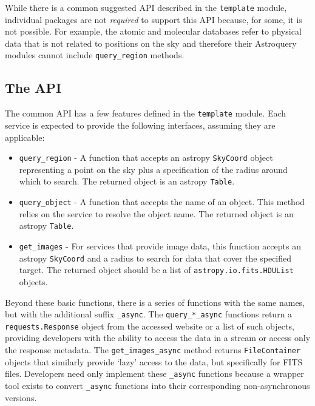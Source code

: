\documentclass[twocolumn]{aastex61}
\begin{document}
While there is a common suggested API described in the \texttt{template} module,
individual packages are not \emph{required} to support this API because, for
some, it is not possible.  For example, the atomic and molecular databases refer
to physical data that is not related to positions on the sky and therefore
their Astroquery modules cannot include \texttt{query\_region} methods.

\subsection{The API}
The common API has a few features defined in the \texttt{template} module.
Each service is expected to provide the following interfaces, assuming they are
applicable:

\begin{itemize}
    \item \texttt{query\_region} - A function that accepts an astropy
        \texttt{SkyCoord} object representing a point on the sky plus a
        specification of the radius around which to search.
        The returned object is an astropy \texttt{Table}.
    \item \texttt{query\_object} - A function that accepts the name of an
        object.  This method relies on the service to resolve the object name.
        The returned object is an astropy \texttt{Table}.
    \item \texttt{get\_images} - For services that provide image data, this
        function accepts an astropy \texttt{SkyCoord} and a radius to search for data
        that cover the specified target. The returned object should be a list
        of \texttt{astropy.io.fits.HDUList} objects.
\end{itemize}

Beyond these basic functions, there is a series of functions with the same
names, but with the additional suffix \texttt{\_async}.  The
\texttt{query\_*\_async} functions return a \texttt{requests.Response} object
from the accessed website or a list of such objects, providing developers with
the ability to access the data in a stream or access only the response
metadata.  The \texttt{get\_images\_async} method returns
\texttt{FileContainer} objects that similarly provide `lazy' access to the
data, but specifically for FITS files.  Developers need only implement
these \texttt{\_async} functions because a wrapper tool exists to convert
\texttt{\_async} functions into their corresponding non-asynchronous versions.
\end{document}
